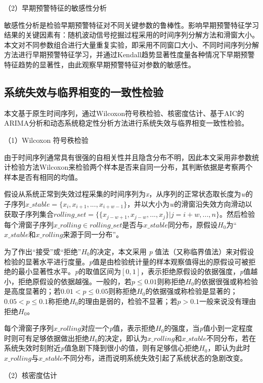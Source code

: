 （2）早期预警特征的敏感性分析

敏感性分析是检验早期预警特征对不同关键参数的鲁棒性。影响早期预警特征学习结果的关键因素有：随机波动信号挖掘过程采用的时间序列分解方法和滑窗大小。本文对不同参数组合进行大量重复实验，即采用不同窗口大小、不同时间序列分解方法进行早期预警特征学习，并通过Kendall趋势显著性度量各种情况下早期预警特征趋势的显著性，由此观察早期预警特征对参数的敏感性。

\subsection{系统失效与临界相变的一致性检验}
\label{sec:csd-existence-test}

本文基于原生时间序列，通过Wilcoxon符号秩检验、核密度估计、基于AIC的ARIMA分析和动态系统稳定性分析方法进行系统失效与临界相变一致性检验。

（1）Wilcoxon 符号秩检验

由于时间序列通常具有很强的自相关性并且隐含分布不明，因此本文采用非参数统计检验方法Wilcoxon来检验两个样本是否来自同一分布，其判断依据是考察两个样本是否有相同的均值。

假设从系统正常到失效过程采集的时间序列为\emph{x}，从序列的正常状态取长度为\emph{w}的子序列$x\_stable = \{x_{i}, x_{i+1}, ..., x_{i+w-1}\}$，并以大小为\emph{w}的滑窗沿失效方向滑动以获取子序列集合$rolling\_set =\{\{x_{j-w+1}, x_{j-w},..., x_{j}\} | j=i+w,...,n\}$。然后检验每个滑窗子序列$x\_rolling \in rolling\_set$是否与$x\_stable$同分布，原假设$H_{0}$为“$x\_stable$和$x\_rolling$来源于同一分布”。

为了作出“接受”或“拒绝”$H_{0}$的决定，本文采用 \emph{p} 值法（又称临界值法）来对假设检验的显著水平进行度量。\emph{p}值是由检验统计量的样本观察值得出的原假设可被拒绝的最小显著性水平。\emph{p}的取值区间为$[0, 1]$，表示拒绝原假设的依据强度，\emph{p}值越小，拒绝原假设的依据越强。一般的，若$p \leqslant 0.01$则称拒绝$H_{0}$的依据很强或称检验是高度显著的；若$0.01 < p \leqslant 0.05$则称拒绝$H_{0}$的依据强或称检验是显著的；$0.05 < p \leqslant 0.1$称拒绝$H_{0}$的理由是弱的，检验不显著；若$p>0.1$一般来说没有理由拒绝$H_{0}$。

每个滑窗子序列$x\_rolling$对应一个\emph{p}值，表示拒绝$H_{0}$的强度，当\emph{p}值小到一定程度时则可有足够依据做出拒绝$H_{0}$的决定，即认为$x\_rolling$和$x\_stable$不同分布，若在系统失效时刻附近\emph{p}值急剧下降到很小的值，则有足够信心拒绝$H_{0}$，即认为此时$x\_rolling$与$x\_stable$不同分布，进而说明系统失效引起了系统状态的急剧改变。

（2）核密度估计

